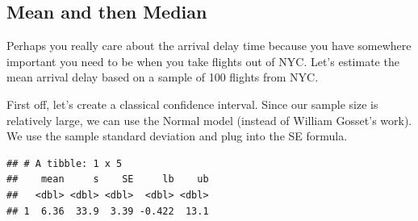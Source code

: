 \documentclass[
]{book}
\newenvironment{Shaded}{\begin{snugshade}}{\end{snugshade}}
\newcommand{\DataTypeTok}[1]{\textcolor[rgb]{0.13,0.29,0.53}{#1}}
\newcommand{\DecValTok}[1]{\textcolor[rgb]{0.00,0.00,0.81}{#1}}
\newcommand{\KeywordTok}[1]{\textcolor[rgb]{0.13,0.29,0.53}{\textbf{#1}}}
\newcommand{\NormalTok}[1]{#1}
\newcommand{\OperatorTok}[1]{\textcolor[rgb]{0.81,0.36,0.00}{\textbf{#1}}}
\newcommand{\StringTok}[1]{\textcolor[rgb]{0.31,0.60,0.02}{#1}}
\begin{document}
\hypertarget{mean-and-then-median}{%
\subsection{Mean and then Median}\label{mean-and-then-median}}

Perhaps you really care about the arrival delay time because you have somewhere important you need to be when you take flights out of NYC. Let's estimate the mean arrival delay based on a sample of 100 flights from NYC.

First off, let's create a classical confidence interval. Since our sample size is relatively large, we can use the Normal model (instead of William Gosset's work). We use the sample standard deviation and plug into the SE formula.

\begin{Shaded}
\end{Shaded}

\begin{verbatim}
## # A tibble: 1 x 5
##    mean     s    SE     lb    ub
##   <dbl> <dbl> <dbl>  <dbl> <dbl>
## 1  6.36  33.9  3.39 -0.422  13.1
\end{verbatim}
\end{document}
